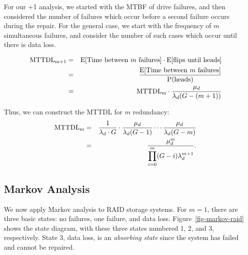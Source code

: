 \documentclass[11pt]{article}
\numberwithin{equation}{section}
\begin{document}
For our +1 analysis, we started with the MTBF of drive failures, and then
considered the number of failures which occur before a second failure occurs
during the repair.  For the general case, we start with the frequency of $m$
simultaneous failures, and consider the number of such cases which occur until
there is data loss.

\begin{eqnarray}
{\rm MTTDL_{m+1}} & = & \textrm{E[Time between $m$ failures]} \cdot 
\textrm{E[flips until heads]} 
\\
& = & \frac{\textrm{E[Time between $m$ failures]}}{\textrm{P(heads)}} 
\\
& = & {\rm MTTDL_{m}} \cdot \frac{\mu_{d}}{\lambda_{d} (G-(m+1))} 
\end{eqnarray}

Thus, we can construct the MTTDL for $m$ redundancy:
\begin{eqnarray}
{\rm MTTDL_{m}} & = & \frac{1}{\lambda_{d} \cdot G} \cdot 
\frac{\mu_{d}}{\lambda_{d} (G-1)} \cdots \frac{\mu_{d}}{\lambda_{d} (G-m)} \\
& = & \frac{\mu_{d}^{m}}{\displaystyle \prod_{i=0}^{m}(G - i)\lambda_{d}^{m+1}} 
\label{eq-raid}. 
\end{eqnarray}

\subsection{Markov Analysis}
\label{sec-raid-markov}

We now apply Markov analysis to RAID storage systems.  For $m=1$, there are
three basic states: no failures, one failure, and data loss.
Figure~\ref{fig-markov-raid} shows the state diagram, with these three states
numbered 1, 2, and 3, respectively.  State 3, data loss, is an {\em absorbing
state} since the system has failed and cannot be repaired.
\end{document}
